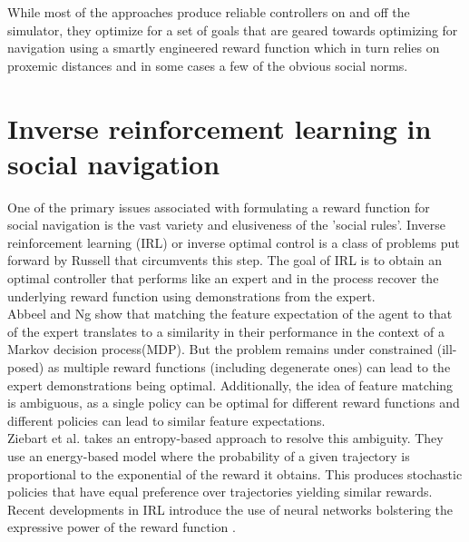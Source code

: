 While most of the approaches produce reliable controllers on and off the simulator, they optimize for a set of goals that are geared towards optimizing for navigation using a smartly engineered reward function which in turn relies on proxemic distances and in some cases a few of the obvious social norms.\\

\section{Inverse reinforcement learning in social navigation}
One of the primary issues associated with formulating a reward function for social navigation is the vast variety and elusiveness of the 'social rules'. Inverse reinforcement learning (IRL) or inverse optimal control is a class of problems put forward by Russell \cite{russel_irl_1998} that circumvents this step. The goal of IRL is to obtain an optimal controller that performs like an expert and in the process recover the underlying reward function using demonstrations from the expert. \\

Abbeel and Ng \cite{abbeel_apprenticeshiplearning_2004} show that matching the feature expectation of the agent to that of the expert translates to a similarity in their performance in the context of a Markov decision process(MDP). But the problem remains under constrained (ill-posed) as multiple reward functions (including degenerate ones) can lead to the expert demonstrations being optimal. Additionally, the idea of feature matching is ambiguous, as a single policy can be optimal for different reward functions and different policies can lead to similar feature expectations. \\

Ziebart et al. \cite{ziebart_maxent_2008} takes an entropy-based approach to resolve this ambiguity. They use an energy-based model where the probability of a given trajectory is proportional to the exponential of the reward it obtains. This produces stochastic policies that have equal preference over trajectories yielding similar rewards. Recent developments in IRL introduce the use of neural networks bolstering the expressive power of the reward function \cite{wulfmeier2015maximum}. \\

